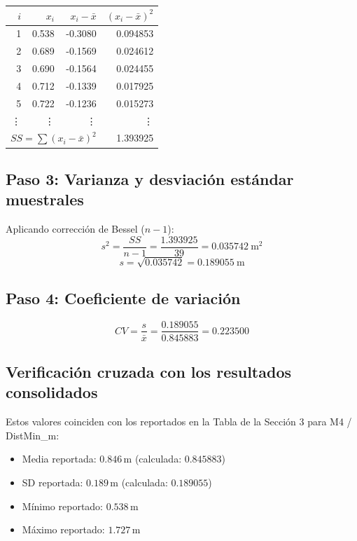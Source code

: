 \documentclass[12pt,a4paper,oneside]{book}
\begin{document}
\begin{tabular}{rrrr}
\toprule
$i$ & $x_i$ & $x_i-\bar{x}$ & $(x_i-\bar{x})^2$ \\
\midrule
1 & 0.538 & -0.3080 & 0.094853 \\
2 & 0.689 & -0.1569 & 0.024612 \\
3 & 0.690 & -0.1564 & 0.024455 \\
4 & 0.712 & -0.1339 & 0.017925 \\
5 & 0.722 & -0.1236 & 0.015273 \\
\vdots & \vdots & \vdots & \vdots \\
\midrule
\multicolumn{3}{r}{$SS = \sum (x_i-\bar{x})^2$} & 1.393925 \\
\bottomrule
\end{tabular}

\subsection{Paso 3: Varianza y desviación estándar muestrales}

Aplicando corrección de Bessel ($n-1$):
\begin{equation}
s^2 = \frac{SS}{n-1} = \frac{1.393925}{39} = 0.035742\ \mathrm{m}^2
\end{equation}
\begin{equation}
s = \sqrt{0.035742} = 0.189055\ \mathrm{m}
\end{equation}

\subsection{Paso 4: Coeficiente de variación}

\begin{equation}
CV = \frac{s}{\bar{x}} = \frac{0.189055}{0.845883} = 0.223500
\end{equation}


\subsection{Verificación cruzada con los resultados consolidados}

Estos valores coinciden con los reportados en la Tabla de la Sección 3 para M4 / DistMin\_m:
\begin{itemize}
    \item Media reportada: $0.846$\,m \quad(calculada: $0.845883$)
    \item SD reportada: $0.189$\,m \quad(calculada: $0.189055$)
    \item Mínimo reportado: $0.538$\,m
    \item Máximo reportado: $1.727$\,m
\end{itemize}
\end{document}
